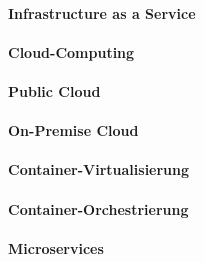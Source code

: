 \paragraph{Infrastructure as a Service}

\paragraph{Cloud-Computing}

\paragraph{Public Cloud}

\paragraph{On-Premise Cloud}

\paragraph{Container-Virtualisierung}

\paragraph{Container-Orchestrierung}

\paragraph{Microservices}